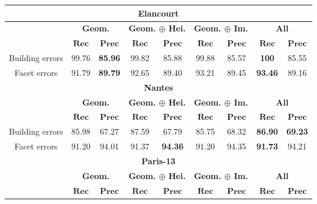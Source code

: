         \begin{table}[htbp]
            \footnotesize
            \centering
            \begin{tabular}{|c | c c | c c | c c | c c |}
                \hline
                \multicolumn{9}{|c|}{\textbf{Elancourt}}\\
                \hline
                &\multicolumn{2}{c|}{\textbf{Geom.}} & \multicolumn{2}{c|}{\textbf{Geom. \(\oplus\) Hei.}} & \multicolumn{2}{c|}{\textbf{Geom. \(\oplus\) Im.}} & \multicolumn{2}{x{1.8cm}|}{\textbf{All}}\\
                \cline{2-9}
                & \(\bm{Rec}\) & \(\bm{Prec}\) &  \(\bm{Rec}\) & \(\bm{Prec}\) &  \(\bm{Rec}\) & \(\bm{Prec}\) &  \(\bm{Rec}\) & \(\bm{Prec}\) \\
                \hline
                Building errors & 99.76 & \textbf{85.96} & 99.82 & 85.88 & 99.88 & 85.57 & \textbf{100} & 85.55 \\
                \hline
                Facet errors & 91.79 & \textbf{89.79} & 92.65 & 89.40 & 93.21 & 89.45 & \textbf{93.46} & 89.16 \\
                \hline
                \hline
                \multicolumn{9}{|c|}{\textbf{Nantes}}\\
                \hline
                &\multicolumn{2}{c|}{\textbf{Geom.}} & \multicolumn{2}{c|}{\textbf{Geom. \(\oplus\) Hei.}} & \multicolumn{2}{c|}{\textbf{Geom. \(\oplus\) Im.}} & \multicolumn{2}{x{1.8cm}|}{\textbf{All}}\\
                \cline{2-9}
                & \(\bm{Rec}\) & \(\bm{Prec}\) &  \(\bm{Rec}\) & \(\bm{Prec}\) &  \(\bm{Rec}\) & \(\bm{Prec}\) &  \(\bm{Rec}\) & \(\bm{Prec}\) \\
                \hline
                Building errors & 85.98 & 67.27 & 87.59 & 67.79 & 85.75 & 68.32 & \textbf{86.90} & \textbf{69.23} \\
                \hline
                Facet errors & 91.20 & 94.01 & 91.37 & \textbf{94.36} & 91.20 & 94.35 & \textbf{91.73} & 94.21\\
                \hline
                \hline
                \multicolumn{9}{|c|}{\textbf{Paris-13}}\\
                \hline
                &\multicolumn{2}{c|}{\textbf{Geom.}} & \multicolumn{2}{c|}{\textbf{Geom. \(\oplus\) Hei.}} & \multicolumn{2}{c|}{\textbf{Geom. \(\oplus\) Im.}} & \multicolumn{2}{x{1.8cm}|}{\textbf{All}}\\
                \cline{2-9}
                & \(\bm{Rec}\) & \(\bm{Prec}\) &  \(\bm{Rec}\) & \(\bm{Prec}\) &  \(\bm{Rec}\) & \(\bm{Prec}\) &  \(\bm{Rec}\) & \(\bm{Prec}\) \\

\end{tabular}
\end{table}
